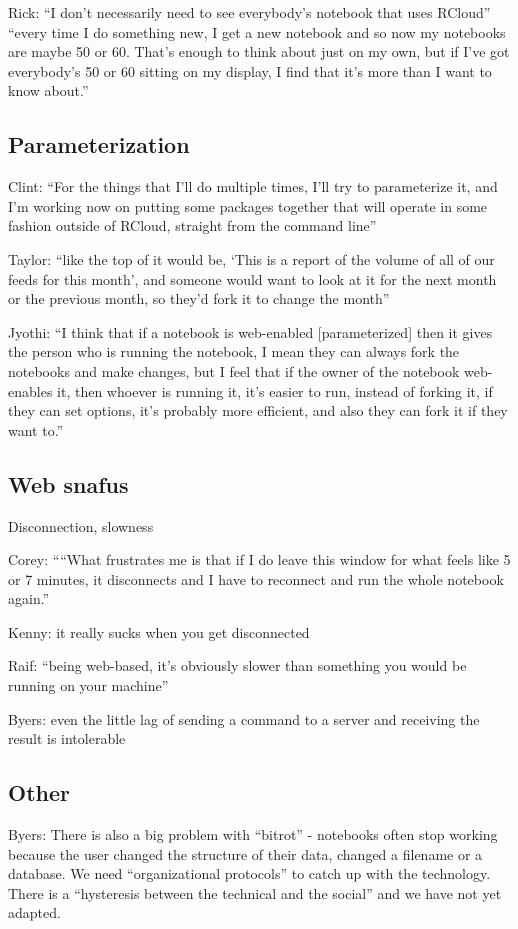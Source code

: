 Rick: ``I don't necessarily need to see everybody's notebook that uses RCloud'' ``every time I do something new, I get a new notebook and so now my notebooks are maybe 50 or 60. That's enough to think about just on my own, but if I've got everybody's 50 or 60 sitting on my display, I find that it's more than I want to know about.''


\subsection{Parameterization}
Clint: ``For the things that I'll do multiple times, I'll try to parameterize it, and I'm working now on putting some packages together that will operate in some fashion outside of RCloud, straight from the command line''

Taylor: ``like the top of it would be, `This is a report of the volume of all of our feeds for this month', and someone would want to look at it for the next month or the previous month, so they'd fork it to change the month''

Jyothi: ``I think that if a notebook is web-enabled [parameterized] then it gives the person who is running the notebook, I mean they can always fork the notebooks and make changes, but I feel that if the owner of the notebook web-enables it, then whoever is running it, it's easier to run, instead of forking it, if they can set options, it's probably more efficient, and also they can fork it if they want to.''


\subsection{Web snafus}
Disconnection, slowness

Corey: ``“What frustrates me is that if I do leave this window for what feels like 5 or 7 minutes, it disconnects and I have to reconnect and run the whole notebook again.''

Kenny: it really sucks when you get disconnected

Raif: ``being web-based, it's obviously slower than something you would be running on your machine''

Byers: even the little lag of sending a command to a server and receiving the result is intolerable


\subsection{Other}
Byers: There is also a big problem with ``bitrot'' - notebooks often stop working because the user changed the structure of their data, changed a filename or a database.  We need ``organizational protocols'' to catch up with the technology.  There is a ``hysteresis between the technical and the social'' and we have not yet adapted.

